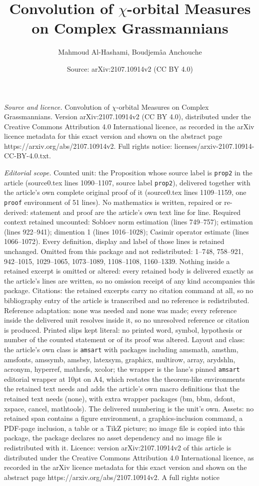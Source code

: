 \documentclass[10pt,a4paper]{amsart}
\title[Convolution of $\chi$-orbital Measures on Complex Grassmanni]{Convolution of $\chi$-orbital Measures on Complex Grassmannians}
\author{Mahmoud Al-Hashami, Boudjem\^aa Anchouche}
\date{Source: arXiv:2107.10914v2 (CC BY 4.0)}
\begin{document}
\maketitle

\noindent\emph{Source and licence.} Convolution of $\chi$-orbital Measures on Complex Grassmannians. Version arXiv:2107.10914v2 (CC BY 4.0), distributed under the Creative Commons Attribution 4.0 International licence, as recorded in the arXiv licence metadata for this exact version and shown on the abstract page https://arxiv.org/abs/2107.10914v2. Full rights notice: licenses/arxiv-2107.10914-CC-BY-4.0.txt.\par\smallskip

\noindent\textit{Editorial scope.} Counted unit: the Proposition whose source label is \texttt{prop2} in the article (source0.tex lines 1090--1107, source label \texttt{prop2}), delivered together with the article's own complete original proof of it (source0.tex lines 1109--1159, one \texttt{proof} environment of 51 lines). No mathematics is written, repaired or re-derived: statement and proof are the article's own text line for line. Required context retained uncounted: Sobloev norm estimation (lines 749--757); estimation (lines 922--941); dimention 1 (lines 1016--1028); Casimir operator estimate (lines 1066--1072). Every definition, display and label of those lines is retained unchanged. Omitted from this package and not redistributed: 1--748, 758--921, 942--1015, 1029--1065, 1073--1089, 1108--1108, 1160--1339. Nothing inside a retained excerpt is omitted or altered: every retained body is delivered exactly as the article's lines are written, so no omission receipt of any kind accompanies this package. Citations: the retained excerpts carry no citation command at all, so no bibliography entry of the article is transcribed and no reference is redistributed. Reference adaptation: none was needed and none was made; every reference inside the delivered unit resolves inside it, so no unresolved reference or citation is produced. Printed slips kept literal: no printed word, symbol, hypothesis or number of the counted statement or of its proof was altered. Layout and class: the article's own class is \texttt{amsart} with packages including amsmath, amsthm, amsfonts, amssymb, amsbsy, latexsym, graphicx, multirow, array, arydshln, acronym, hyperref, mathrsfs, xcolor; the wrapper is the lane's pinned \texttt{amsart} editorial wrapper at 10pt on A4, which restates the theorem-like environments the retained text needs and adds the article's own macro definitions that the retained text needs (none), with extra wrapper packages (bm, bbm, dsfont, xspace, cancel, mathtools). The delivered numbering is the unit's own. Assets: no retained span contains a figure environment, a graphics-inclusion command, a PDF-page inclusion, a table or a TikZ picture; no image file is copied into this package, the package declares no asset dependency and no image file is redistributed with it. Licence: version arXiv:2107.10914v2 of this article is distributed under the Creative Commons Attribution 4.0 International licence, as recorded in the arXiv licence metadata for this exact version and shown on the abstract page https://arxiv.org/abs/2107.10914v2. A full rights notice 
\end{document}
